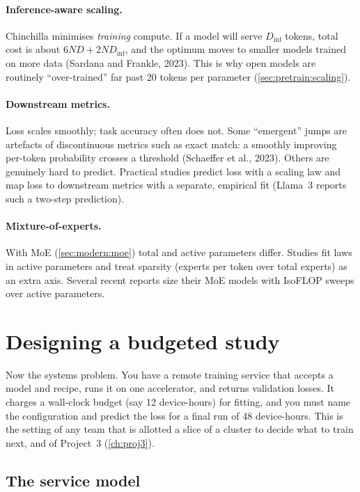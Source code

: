 \paragraph{Inference-aware scaling.} Chinchilla minimises \emph{training} compute. If a model
will serve $D_{\text{inf}}$ tokens, total cost is about $6ND + 2ND_{\text{inf}}$, and the optimum
moves to smaller models trained on more data (Sardana and Frankle, 2023). This is why open models
are routinely ``over-trained'' far past 20 tokens per parameter (\cref{sec:pretrain:scaling}).

\paragraph{Downstream metrics.} Loss scales smoothly; task accuracy often does not. Some
``emergent'' jumps are artefacts of discontinuous metrics such as exact match: a smoothly
improving per-token probability crosses a threshold (Schaeffer et al., 2023). Others are
genuinely hard to predict. Practical studies predict loss with a scaling law and map loss to
downstream metrics with a separate, empirical fit (Llama~3 reports such a two-step prediction).

\paragraph{Mixture-of-experts.} With MoE (\cref{sec:modern:moe}) total and active parameters
differ. Studies fit laws in active parameters and treat sparsity (experts per token over total
experts) as an extra axis. Several recent reports size their MoE models with IsoFLOP sweeps
over active parameters.

\section{Designing a budgeted study}\label{sec:scalinglaws:design}

Now the systems problem. You have a remote training service that accepts a model and recipe,
runs it on one accelerator, and returns validation losses. It charges a wall-clock budget
(say 12 device-hours) for fitting, and you must name the configuration and predict the loss for
a final run of 48 device-hours. This is the setting of any team that is allotted a slice of
a cluster to decide what to train next, and of Project~3 (\cref{ch:proj3}).

\subsection{The service model}\label{sec:scalinglaws:service}

